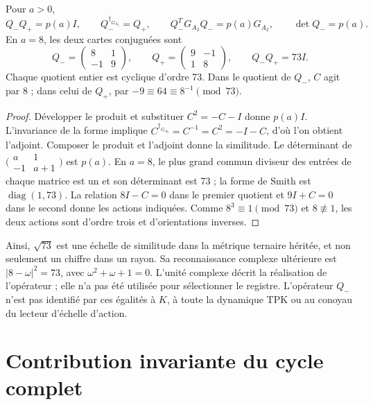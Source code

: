 \begin{proposition}
\label{x_reciprocidad:lib02:norma-A2}
Pour \(a>0\),
\[
 Q_-Q_+=p(a)I,\qquad Q_-^{\dagger_{G_{A_2}}}=Q_+,
 \qquad Q_-^TG_{A_2}Q_-=p(a)G_{A_2},\qquad \det Q_-=p(a).
\]
En \(a=8\), les deux cartes conjuguées sont
\[
 Q_-=
 \begin{pmatrix}8&1\\-1&9\end{pmatrix},\qquad
 Q_+=\begin{pmatrix}9&-1\\1&8\end{pmatrix},\qquad Q_-Q_+=73I.
\]
Chaque quotient entier est cyclique d’ordre 73. Dans le quotient de \(Q_-\),
\(C\) agit par \(8\) ; dans celui de \(Q_+\), par
\(-9\equiv64\equiv8^{-1}\pmod{73}\).
\end{proposition}
\begin{proof}
Développer le produit et substituer \(C^2=-C-I\) donne \(p(a)I\).
L’invariance de la forme implique
\(C^{\dagger_{G_{A_2}}}=C^{-1}=C^2=-I-C\), d’où l’on obtient
l’adjoint. Composer le produit et l’adjoint donne la similitude. Le déterminant
de \(\bigl(\begin{smallmatrix}a&1\\-1&a+1\end{smallmatrix}\bigr)\) est \(p(a)\). En \(a=8\), le plus grand commun diviseur des entrées de chaque matrice est un et son déterminant est 73 ; la forme de Smith est \(\operatorname{diag}(1,73)\). La relation \(8I-C=0\) dans le premier quotient et \(9I+C=0\) dans le second donne les actions indiquées. Comme \(8^3\equiv1\pmod{73}\) et \(8\not\equiv1\), les deux actions sont d'ordre trois et d'orientations inverses.
\end{proof}

Ainsi, \(\sqrt{73}\) est une échelle de similitude dans la métrique ternaire
héritée, et non seulement un chiffre dans un rayon. Sa reconnaissance complexe
ultérieure est \(|8-\omega|^2=73\), avec
\(\omega^2+\omega+1=0\). L’unité complexe décrit la réalisation
de l’opérateur ; elle n’a pas été utilisée pour sélectionner le registre. L’opérateur
\(Q_-\) n’est pas identifié par ces égalités à \(K\), à toute
la dynamique TPK ou au conoyau du lecteur d’échelle d’action.

\section{Contribution invariante du cycle complet}
\label{x_reciprocidad:lib02:ciclo-completo}

